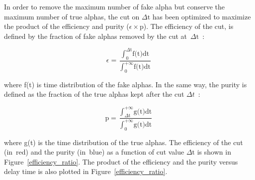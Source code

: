 \documentclass[main.tex]{subfiles}
\begin{document}
\noindent In order to remove the maximum number of fake alpha but conserve the maximum number of true alphas, the cut on $\Delta \text{t}$ has been optimized to maximize the product of the efficiency and purity ($\epsilon \times \text{p}$). The efficiency of the cut, is defined by the fraction of fake alphas removed by the cut at~$\Delta \text{t}$~:


\begin{equation}
\epsilon = \frac{ \displaystyle{\int_0^{\Delta \text{t}}} \text{f(t)} \text{dt} } { \displaystyle{\int_\text{0}^{+\infty}} \text{f(t)} \text{dt}} 
\end{equation}


\noindent where f(t) is time distribution of the fake alphas. In the same way, the purity is defined as the fraction of the true alphas kept after the cut $\Delta t$~:

\begin{equation}
\text{p} = \frac{ \displaystyle{\int_{\Delta \text{t}}^{+\infty}} \text{g(t)} \text{dt} } { \displaystyle{\int_\text{0}^{+\infty}} \text{g(t)} \text{dt}} 
\end{equation}

\noindent where g(t) is the time distribution of the true alphas. The efficiency of the cut (in~red) and the purity (in~blue) as a function of cut value $\Delta \text{t}$ is shown in Figure~\ref{efficiency_ratio}. The product of the efficiency and the purity versus delay time is also plotted in Figure~\ref{efficiency_ratio}.
\end{document}
